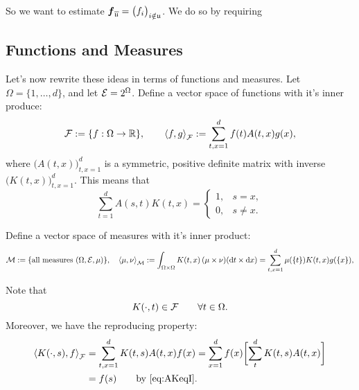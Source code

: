 \documentclass[reqno]{amsart}
\begin{document}
So we want to estimate $\vf_{\overline{\fu}} = \bigl( f_i \bigr)_{i \notin \fu}$. We do so by requiring 



\subsection{Functions and Measures}
Let's now rewrite these ideas in terms of functions and measures.  Let $\Omega = \{1, \ldots, d\}$, and let $\ce = 2^\Omega$.  Define a vector space of functions with it's inner produce:
\begin{equation*}
    \cf : = \{f : \Omega \to \reals\}, \qquad \ip[\cf]{f}{g} := \sum_{t,x=1}^d f(t) A(t,x) g(x),
\end{equation*}
where $\bigl( A(t,x) \bigr)_{t,x = 1}^d$ is a symmetric, positive definite matrix with inverse $\bigl( K(t,x) \bigr)_{t,x = 1}^d$.  This means that
\begin{equation} \label{eq:AKeqI}
    \sum_{t=1}^d A(s,t)K(t,x) = \begin{cases} 1, & s=x, \\ 0, & s\ne x. \end{cases}
\end{equation}

Define a vector space of measures with it's inner product:
\begin{equation*}
    \cm : = \{\text{all measures } (\Omega, \ce, \mu) \}, \quad 
    \ip[\cm]{\mu}{\nu} := \int_{\Omega \times \Omega} K(t,x) \, (\mu \times \nu) (\dif t \times \dif x) = \sum_{t,x=1}^d \mu(\{t\}) K(t,x) g(\{x\}),
\end{equation*}

Note that 
\[
K(\cdot,t) \in \cf \qquad \forall t \in \Omega.
\]
Moreover, we have the reproducing property:
\begin{align*}
\ip[\cf]{K(\cdot,s)}{f} &=  \sum_{t,x=1}^d K(t,s) A(t,x) f(x) 
= \sum_{x=1}^d f(x) \biggl[\sum_{t}^d K(t,s) A(t,x) \biggr] \\
& = f(s) \qquad \text{by \eqref{eq:AKeqI}}.
\end{align*}
\end{document}
